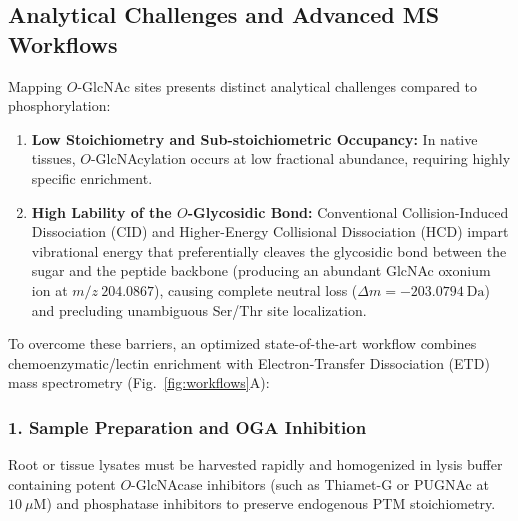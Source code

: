 \subsection{Analytical Challenges and Advanced MS Workflows}

Mapping $O$-GlcNAc sites presents distinct analytical challenges compared to phosphorylation:
\begin{enumerate}
    \item \textbf{Low Stoichiometry and Sub-stoichiometric Occupancy:} In native tissues, $O$-GlcNAcylation occurs at low fractional abundance, requiring highly specific enrichment.
    \item \textbf{High Lability of the $O$-Glycosidic Bond:} Conventional Collision-Induced Dissociation (CID) and Higher-Energy Collisional Dissociation (HCD) impart vibrational energy that preferentially cleaves the glycosidic bond between the sugar and the peptide backbone (producing an abundant GlcNAc oxonium ion at $m/z~204.0867$), causing complete neutral loss ($\Delta m = -203.0794~\text{Da}$) and precluding unambiguous Ser/Thr site localization.
\end{enumerate}

To overcome these barriers, an optimized state-of-the-art workflow combines chemoenzymatic/lectin enrichment with Electron-Transfer Dissociation (ETD) mass spectrometry (Fig.~\ref{fig:workflows}A):

\subsubsection{1. Sample Preparation and OGA Inhibition}
Root or tissue lysates must be harvested rapidly and homogenized in lysis buffer containing potent $O$-GlcNAcase inhibitors (such as Thiamet-G or PUGNAc at $10~\mu\text{M}$) and phosphatase inhibitors to preserve endogenous PTM stoichiometry.

